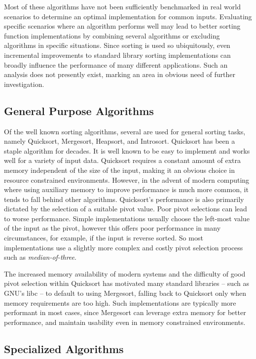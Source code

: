 \documentclass[12pt, conference]{ieeeconf}
\begin{document}
Most of these algorithms have not been sufficiently benchmarked in real world
scenarios to determine an optimal implementation for common inputs. Evaluating
specific scenarios where an algorithm performs well may lead to better sorting
function implementations by combining several algorithms or excluding algorithms
in specific situations. Since sorting is used so ubiquitously, even incremental
improvements to standard library sorting implementations can broadly influence
the performance of many different applications. Such an analysis does not
presently exist, marking an area in obvious need of further investigation.

\subsection{General Purpose Algorithms}

Of the well known sorting algorithms, several are used for general sorting
tasks, namely Quicksort, Mergesort, Heapsort, and Introsort. Quicksort has been
a staple algorithm for decades. It is well known to be easy to implement and
works well for a variety of input data. Quicksort requires a constant amount of
extra memory independent of the size of the input, making it an obvious choice
in resource constrained environments. However, in the advent of modern computing
where using auxiliary memory to improve performance is much more common, it
tends to fall behind other algorithms. Quicksort's performance is also primarily
dictated by the selection of a suitable pivot value. Poor pivot selections can
lead to worse performance. Simple implementations usually choose the left-most
value of the input as the pivot, however this offers poor performance in many
circumstances, for example, if the input is reverse sorted. So most
implementations use a slightly more complex and costly pivot selection process
such as \textit{median-of-three}\parencite{Bentley1993EngineeringAS}.

The increased memory availability of modern systems and the difficulty of good
pivot selection within Quicksort has motivated many standard libraries -- such
as GNU's libc -- to default to using Mergesort, falling back to Quicksort only
when memory requirements are too high\parencite{glibc}. Such implementations are
typically more performant in most cases, since Mergesort can leverage extra
memory for better performance, and maintain usability even in memory constrained
environments.

\subsection{Specialized Algorithms}
\end{document}
